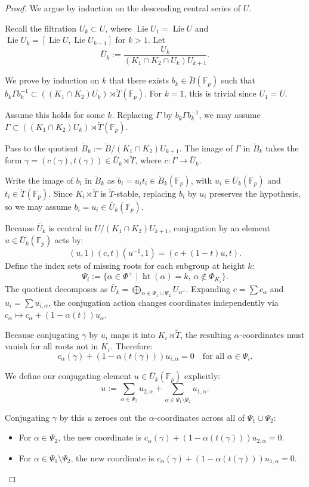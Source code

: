 \documentclass[11pt]{amsart}
\theoremstyle{definition}
\newcommand{\bF}{\mathbb{F}}
\newcommand{\bB}{\breve{B}}
\newcommand{\bT}{\breve{T}}
\DeclareMathOperator{\Lie}{Lie}
\begin{document}
\begin{proof}
We argue by induction on the descending central series of $U$.

Recall the filtration $U_k \subset U$, where $\Lie U_1 = \Lie U$ and $\Lie U_k = [\Lie U, \Lie U_{k-1}]$ for $k > 1$. Let
\[
\bar{U}_k := \frac{U_k}{(K_1\cap K_2\cap U_k)U_{k+1}}.
\]

We prove by induction on $k$ that there exists $b_k\in \bB(\bF_p)$ such that $b_k\Gamma b_k^{-1}\subset ((K_1\cap K_2)U_k)\rtimes \bT(\bF_p)$. For $k=1$, this is trivial since $U_1 = U$.

Assume this holds for some $k$. Replacing $\Gamma$ by $b_k\Gamma b_k^{-1}$, we may assume $\Gamma\subset ((K_1\cap K_2)U_k)\rtimes \bT(\bF_p)$.

Pass to the quotient $\bB_k := \bB/(K_1\cap K_2)U_{k+1}$. The image of $\Gamma$ in $\bB_k$ takes the form $\gamma=(c(\gamma),t(\gamma)) \in \bar{U}_k\rtimes \bT$, where $c:\Gamma\to \bar{U}_k$.

Write the image of $b_i$ in $\bB_k$ as $b_i = u_i t_i \in \bB_k(\bF_p)$, with $u_i \in \bar{U}_k(\bF_p)$ and $t_i \in \bT(\bF_p)$. Since $K_i\rtimes \bT$ is $\bT$-stable, replacing $b_i$ by $u_i$ preserves the hypothesis, so we may assume $b_i = u_i \in \bar{U}_k(\bF_p)$.

Because $\bar{U}_k$ is central in $U/(K_1\cap K_2)U_{k+1}$, conjugation by an element $u\in \bar{U}_k(\bF_p)$ acts by:
\[
(u,1)(c,t)(u^{-1},1) = (c+(1-t)u,t).
\]
Define the index sets of missing roots for each subgroup at height $k$:
\[
\Psi_i := \{\alpha \in \Phi^+ \mid \operatorname{ht}(\alpha)=k, \, \alpha \notin \Phi_{K_i}\}.
\]
The quotient decomposes as $\bar{U}_k = \bigoplus_{\alpha \in \Psi_1 \cup \Psi_2} U_{\alpha^\vee}$. Expanding $c = \sum c_\alpha$ and $u_i = \sum u_{i,\alpha}$, the conjugation action changes coordinates independently via $c_\alpha \mapsto c_\alpha + (1-\alpha(t))u_\alpha$.

Because conjugating $\gamma$ by $u_i$ maps it into $K_i \rtimes \bT$, the resulting $\alpha$-coordinates must vanish for all roots not in $K_i$. Therefore:
\[
c_\alpha(\gamma) + (1-\alpha(t(\gamma)))u_{i,\alpha} = 0 \quad \text{for all } \alpha \in \Psi_i.
\]

We define our conjugating element $u \in \bar{U}_k(\bF_p)$ explicitly:
\[
u := \sum_{\alpha \in \Psi_2} u_{2,\alpha} + \sum_{\alpha \in \Psi_1 \setminus \Psi_2} u_{1,\alpha}.
\]

Conjugating $\gamma$ by this $u$ zeroes out the $\alpha$-coordinates across all of $\Psi_1 \cup \Psi_2$:
\begin{itemize}
    \item For $\alpha \in \Psi_2$, the new coordinate is $c_\alpha(\gamma) + (1-\alpha(t(\gamma)))u_{2,\alpha} = 0$.
    \item For $\alpha \in \Psi_1 \setminus \Psi_2$, the new coordinate is $c_\alpha(\gamma) + (1-\alpha(t(\gamma)))u_{1,\alpha} = 0$.
\end{itemize}


\end{proof}
\end{document}
